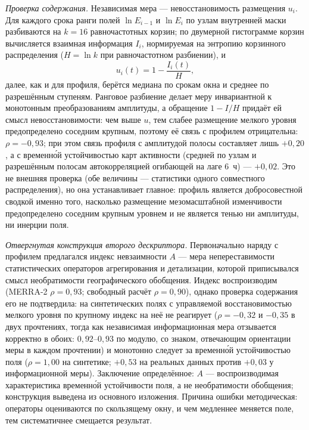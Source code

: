 \documentclass[11pt,a4paper]{article}
\begin{document}
\emph{Проверка содержания.} Независимая мера --- невосстановимость размещения $u_i$. Для каждого срока ранги полей $\ln E_{i-1}$ и $\ln E_i$ по узлам внутренней маски разбиваются на $k=16$ равночастотных корзин; по двумерной гистограмме корзин вычисляется взаимная информация $I_i$, нормируемая на энтропию корзинного распределения ($H=\ln k$ при равночастотном разбиении), и
\begin{equation}
u_i(t)=1-\frac{I_i(t)}{H},
\label{eq:nmi}
\end{equation}
далее, как и для профиля, берётся медиана по срокам окна и среднее по разрешённым ступеням. Ранговое разбиение делает меру инвариантной к монотонным преобразованиям амплитуды, а обращение $1-I/H$ придаёт ей смысл невосстановимости: чем выше $u$, тем слабее размещение мелкого уровня предопределено соседним крупным, поэтому её связь с профилем отрицательна: $\rho=-0{,}93$; при этом связь профиля с амплитудой полосы составляет лишь $+0{,}20$, а с временн\'{о}й устойчивостью карт активности (средней по узлам и разрешённым полосам автокорреляцией огибающей на лаге 6~ч) --- $+0{,}02$. Это не внешняя проверка (обе величины --- статистики одного совместного распределения), но она устанавливает главное: профиль является добросовестной сводкой именно того, насколько размещение мезомасштабной изменчивости предопределено соседним крупным уровнем и не является тенью ни амплитуды, ни инерции поля.

\emph{Отвергнутая конструкция второго дескриптора.} Первоначально наряду с профилем предлагался индекс невзаимности $A$ --- мера непереставимости статистических операторов агрегирования и детализации, которой приписывался смысл необратимости географического обобщения. Индекс воспроизводим (MERRA-2 $\rho=0{,}93$; свободный расчёт $\rho=0{,}90$), однако проверка содержания его не подтвердила: на синтетических полях с управляемой восстановимостью мелкого уровня по крупному индекс на неё не реагирует ($\rho=-0{,}32$ и $-0{,}35$ в двух прочтениях, тогда как независимая информационная мера отзывается корректно в обоих: $0{,}92$--$0{,}93$ по модулю, со знаком, отвечающим ориентации меры в каждом прочтении) и монотонно следует за временн\'{о}й устойчивостью поля ($\rho=1{,}00$ на синтетике; $+0{,}53$ на реальных данных против $+0{,}03$ у информационной меры). Заключение определённое: $A$ --- воспроизводимая характеристика временн\'{о}й устойчивости поля, а не необратимости обобщения; конструкция выведена из основного изложения. Причина ошибки методическая: операторы оцениваются по скользящему окну, и чем медленнее меняется поле, тем систематичнее смещается результат.
\end{document}
